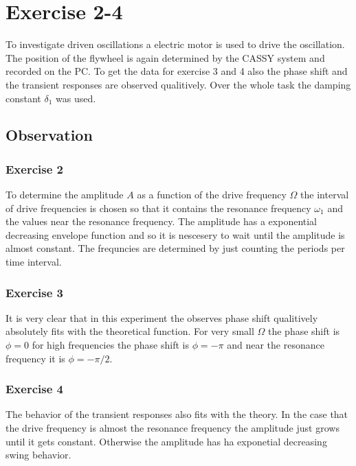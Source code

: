 \newpage
\section{Exercise 2-4}
To investigate driven oscillations a electric motor is used to drive the oscillation.
The position of the flywheel is again determined by the CASSY system and recorded
on the PC. To get the data for exercise 3 and 4 also the phase shift and the 
transient responses are observed qualitively. Over the whole task the damping constant
\(\delta_1\) was used.

\subsection{Observation}

\subsubsection{Exercise 2}
To determine the amplitude \(A\) as a function of the drive frequency \(\Omega\) 
the interval of drive frequencies is chosen so that it contains the resonance frequency 
\(\omega_1\) and the values near the resonance frequency. The amplitude has a exponential decreasing envelope
function and so it is nescesery to wait until the amplitude is almost constant. The
frequncies are determined by just counting the periods per time interval.
  
\subsubsection{Exercise 3}
It is very clear that in this experiment the observes phase shift qualitively absolutely fits
with the theoretical function. For very small \(\Omega\) the phase shift is \(\phi
= 0\) for high frequencies the phase shift is \(\phi = - \pi\) and near the resonance
frequency it is \(\phi = -\pi/2 \).

\subsubsection{Exercise 4}
The behavior of the transient responses also fits with the theory. In the case that
the drive frequency is almost the resonance frequency the amplitude just grows until
it gets constant. Otherwise the amplitude has ha exponetial decreasing swing behavior. 

